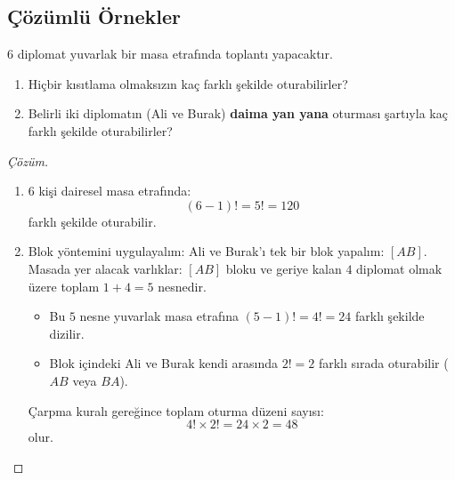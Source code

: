 \subsection{Çözümlü Örnekler}

\begin{example}
$6$ diplomat yuvarlak bir masa etrafında toplantı yapacaktır.
\begin{enumerate}
  \item Hiçbir kısıtlama olmaksızın kaç farklı şekilde oturabilirler?
  \item Belirli iki diplomatın (Ali ve Burak) \textbf{daima yan yana} oturması şartıyla kaç farklı şekilde oturabilirler?
\end{enumerate}
\end{example}
\begin{proof}[Çözüm]
\begin{enumerate}
  \item $6$ kişi dairesel masa etrafında:
  \[ (6 - 1)! = 5! = 120 \]
  farklı şekilde oturabilir.

  \item Blok yöntemini uygulayalım: Ali ve Burak'ı tek bir blok yapalım: $[AB]$.
  Masada yer alacak varlıklar: $[AB]$ bloku ve geriye kalan $4$ diplomat olmak üzere toplam $1 + 4 = 5$ nesnedir.
  \begin{itemize}
    \item Bu $5$ nesne yuvarlak masa etrafına $(5 - 1)! = 4! = 24$ farklı şekilde dizilir.
    \item Blok içindeki Ali ve Burak kendi arasında $2! = 2$ farklı sırada oturabilir ($AB$ veya $BA$).
  \end{itemize}
  Çarpma kuralı gereğince toplam oturma düzeni sayısı:
  \[ 4! \times 2! = 24 \times 2 = 48 \]
  olur.
\end{enumerate}
\end{proof}

